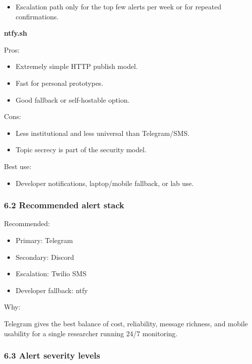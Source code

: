 \documentclass[
]{article}
\providecommand{\tightlist}{%
  \setlength{\itemsep}{0pt}\setlength{\parskip}{0pt}}
\begin{document}
\begin{itemize}
\tightlist
\item
  Escalation path only for the top few alerts per week or for repeated
  confirmations.
\end{itemize}

\textbf{ntfy.sh}

Pros:

\begin{itemize}
\tightlist
\item
  Extremely simple HTTP publish model.
\item
  Fast for personal prototypes.
\item
  Good fallback or self-hostable option.
\end{itemize}

Cons:

\begin{itemize}
\tightlist
\item
  Less institutional and less universal than Telegram/SMS.
\item
  Topic secrecy is part of the security model.
\end{itemize}

Best use:

\begin{itemize}
\tightlist
\item
  Developer notifications, laptop/mobile fallback, or lab use.
\end{itemize}

\subsubsection{6.2 Recommended alert
stack}\label{62-recommended-alert-stack}

Recommended:

\begin{itemize}
\tightlist
\item
  Primary: Telegram
\item
  Secondary: Discord
\item
  Escalation: Twilio SMS
\item
  Developer fallback: ntfy
\end{itemize}

Why:

Telegram gives the best balance of cost, reliability, message richness,
and mobile usability for a single researcher running 24/7 monitoring.

\subsubsection{6.3 Alert severity
levels}\label{63-alert-severity-levels}
\end{document}
